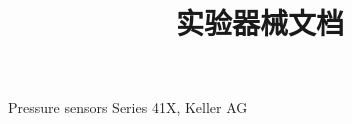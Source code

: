 \documentclass[titlepage,12pt]{article}
\title{实验器械文档}
\begin{document}
\maketitle

Pressure sensors Series 41X, Keller AG
\end{document}
